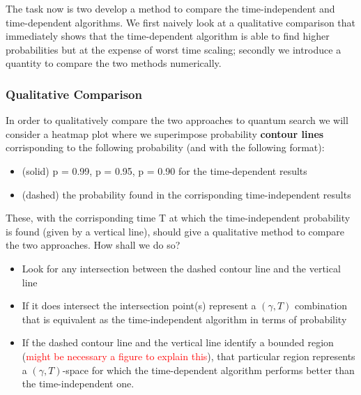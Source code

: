\documentclass[aps,pra,reprint, onecolumn]{revtex4-2}
\newcommand{\red}[1]{\textcolor{red}{#1}}
\begin{document}
The task now is two develop a method to compare the time-independent and time-dependent algorithms. We first naively look at a qualitative comparison that immediately shows that the time-dependent algorithm is able to find higher probabilities but at the expense of worst time scaling; secondly we introduce a quantity to compare the two methods numerically.

\subsubsection{\textbf{Qualitative Comparison}}
In order to qualitatively compare the two approaches to quantum search we will consider a heatmap plot where we superimpose probability \textbf{contour lines} corrisponding to the following probability (and with the following format):
\begin{itemize}
  \item (solid) p = 0.99, p = 0.95, p = 0.90 for the time-dependent results
  \item (dashed) the probability found in the corrisponding time-independent results
\end{itemize}
These, with the corrisponding time T at which the time-independent probability is found (given by a vertical line), should give a qualitative method to compare the two approaches. How shall we do so?
\begin{itemize}
	\item Look for any intersection between the dashed contour line and the vertical line
	\item If it does intersect the intersection point(s) represent a $(\gamma, T)$ combination that is equivalent as the time-independent algorithm in terms of probability
	\item If the dashed contour line and the vertical line identify a bounded region (\red{might be necessary a figure to explain this}), that particular region represents a $(\gamma, T)$-space for which the time-dependent algorithm performs better than the time-independent one. 
\end{itemize}
\end{document}
